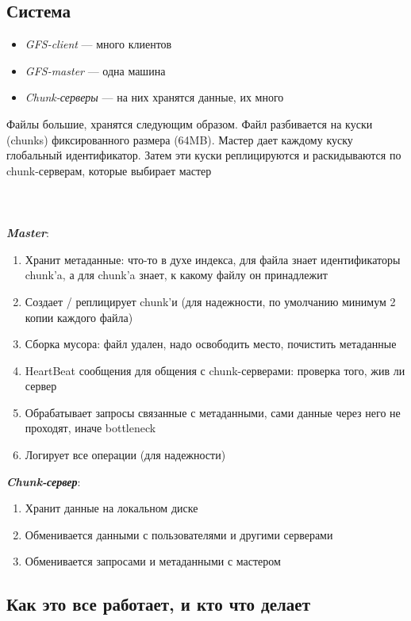     \subsection{Система}
    \begin{itemize}
        \item \textit{GFS-client} --- много клиентов
        \item \textit{GFS-master} --- одна машина
        \item \textit{Chunk-серверы} --- на них хранятся данные, их много
    \end{itemize}
    \quad Файлы большие, хранятся следующим образом. Файл разбивается на куски (chunks) фиксированного размера (64MB). Мастер дает каждому куску глобальный идентификатор. Затем эти куски реплицируются и раскидываются по chunk-серверам, которые выбирает мастер
    \\~\\
    \\~\\
    \textbf{\textit{Master}}:
    \begin{enumerate}
        \item Хранит метаданные: что-то в духе индекса, для файла знает идентификаторы chunk'a, а для chunk'a знает, к какому файлу он принадлежит
        \item Создает / реплицирует chunk'и (для надежности, по умолчанию минимум 2 копии каждого файла)
        \item Сборка мусора: файл удален, надо освободить место, почистить метаданные
        \item HeartBeat сообщения для общения с chunk-серверами: проверка того, жив ли сервер
        \item Обрабатывает запросы связанные с метаданными, сами данные через него не проходят, иначе bottleneck
        \item Логирует все операции (для надежности)
    \end{enumerate}
    \textbf{\textit{Chunk-сервер}}:
    \begin{enumerate}
        \item Хранит данные на локальном диске
        \item Обменивается данными с пользователями и другими серверами
        \item Обменивается запросами и метаданными с мастером
    \end{enumerate}
    
    \subsection{Как это все работает, и кто что делает}
    
